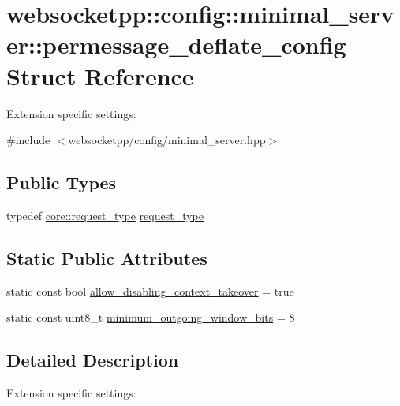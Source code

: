 \hypertarget{structwebsocketpp_1_1config_1_1minimal__server_1_1permessage__deflate__config}{}\section{websocketpp\+:\+:config\+:\+:minimal\+\_\+server\+:\+:permessage\+\_\+deflate\+\_\+config Struct Reference}
\label{structwebsocketpp_1_1config_1_1minimal__server_1_1permessage__deflate__config}


Extension specific settings\+:  




{\ttfamily \#include $<$websocketpp/config/minimal\+\_\+server.\+hpp$>$}

\subsection*{Public Types}
\begin{DoxyCompactItemize}
\item 
typedef \hyperlink{structwebsocketpp_1_1config_1_1core_a6b17eee7cb81f247afc8f3d7b3a3fc9e}{core\+::request\+\_\+type} \hyperlink{structwebsocketpp_1_1config_1_1minimal__server_1_1permessage__deflate__config_a3011304a1e8bf6893f946bfd41e967f6}{request\+\_\+type}
\end{DoxyCompactItemize}
\subsection*{Static Public Attributes}
\begin{DoxyCompactItemize}
\item 
static const bool \hyperlink{structwebsocketpp_1_1config_1_1minimal__server_1_1permessage__deflate__config_a6e01239ebe19410d4214db6bd1b83d53}{allow\+\_\+disabling\+\_\+context\+\_\+takeover} = true
\item 
static const uint8\+\_\+t \hyperlink{structwebsocketpp_1_1config_1_1minimal__server_1_1permessage__deflate__config_a6faed3e781638f77c451d003578d5ca2}{minimum\+\_\+outgoing\+\_\+window\+\_\+bits} = 8
\end{DoxyCompactItemize}


\subsection{Detailed Description}
Extension specific settings\+: 

